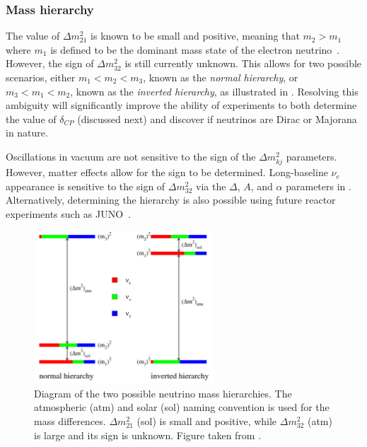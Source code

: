 \subsubsection*{Mass hierarchy} %

The value of $\Delta m_{21}^2$ is known to be small and positive, meaning that $m_{2}>m_{1}$ where
$m_{1}$ is defined to be the dominant mass state of the electron neutrino~\cite{maneira2011}.
However, the sign of $\Delta m_{32}^2$ is still currently unknown. This allows for two possible
scenarios, either $m_1<m_2<m_3$, known as the \emph{normal hierarchy}, or $m_3<m_1<m_2$, known as
the \emph{inverted hierarchy}, as illustrated in . Resolving this
ambiguity will significantly improve the ability of experiments to both determine the value of
$\delta_{CP}$ (discussed next) and discover if neutrinos are Dirac or Majorana in nature.

Oscillations in vacuum are not sensitive to the sign of the $\Delta m_{kj}^{2}$ parameters.
However, matter effects allow for the sign to be determined. Long-baseline $\nu_{e}$ appearance is
sensitive to the sign of $\Delta m_{32}^2$ via the $\Delta$, $A$, and $\alpha$ parameters in
. Alternatively, determining the hierarchy is also possible using
future reactor experiments such as JUNO~\cite{an2016}.

\begin{figure} %
    \includegraphics[origin=c,width=0.6\textwidth]{diagrams/3-theory/hierarchy.pdf}
    \caption[Diagram of the two possible neutrino mass hierarchies]
    {Diagram of the two possible neutrino mass hierarchies. The atmospheric (atm) and solar (sol)
        naming convention is used for the mass differences. $\Delta m_{21}^{2}$ (sol) is small and
        positive, while $\Delta m_{32}^{2}$ (atm) is large and its sign is unknown. Figure taken
        from .}
    \label{fig:hierarchy}
\end{figure}

